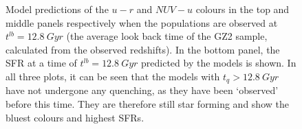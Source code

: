 \documentclass{mn2e}
\begin{document}
\begin{figure}
\caption{Model predictions of the $u-r$ and $NUV-u$ colours in the top and  middle panels respectively when the populations are observed at $t^{lb} = 12.8~Gyr$ (the average look back time of the GZ2 sample, calculated from the observed redshifts). In the bottom panel, the SFR at a time of $t^{lb} = 12.8 ~Gyr$ predicted by the models is shown. In all three plots, it can be seen that the models with $t_q > 12.8~Gyr$ have not undergone any quenching, as they have been `observed' before this time. They are therefore still star forming and show the bluest colours and highest SFRs.}
\label{pred}
\end{figure}
\end{document}
